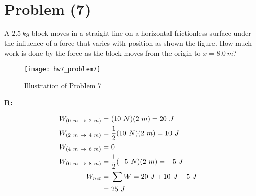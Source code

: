 \section{Problem (7)}
	A $2.5 \ kg$ block moves in a straight line on a horizontal frictionless surface under the influence of a force that varies with position as shown the figure. How much work is done by the force as the block moves from the origin to $x = 8.0 \ m$?

	\begin{figure}[H]
		\begin{center}
			\texttt{[image: hw7\_problem7]}
			\caption{Illustration of Problem 7}
			\label{fig:hw7_problem7}
		\end{center}
	\end{figure}

	\textbf{R:}

	\begin{align}
		W_{(0 \ m \ \to \ 2 \ m)} = \ &(10 \ N)(2 \ m) = 20 \ J& \notag \\
		W_{(2 \ m \ \to \ 4 \ m)} = \ &\frac{1}{2}(10 \ N)(2 \ m) = 10 \ J& \notag \\
		W_{(4 \ m \ \to \ 6 \ m)} = \ &0& \notag \\
		W_{(6 \ m \ \to \ 8 \ m)} = \ &\frac{1}{2}(-5 \ N)(2 \ m) = -5 \ J& \notag \\
		W_{net} = \ &\sum W = 20 \ J + 10 \ J - 5 \ J& \notag \\
		= \ &25 \ J&
	\end{align}
